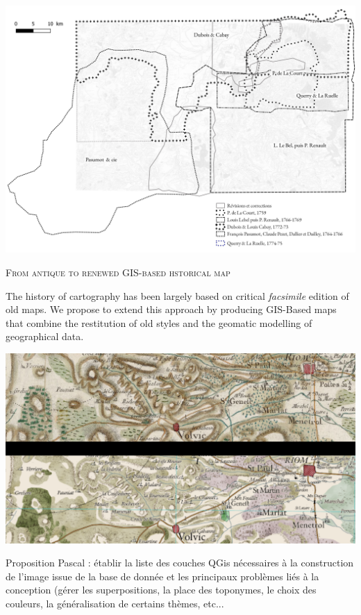 \documentclass[portrait, A0]{sciposter}
\begin{document}
\begin{minipage}[b]{77cm}
\begin{multicols}{3}
\begin{center}
 \label{map:contours}
 \includegraphics[width=21cm]{gfx/Contours.png}
 \end{center}

\normalsize
\textsc{From antique to renewed GIS-based hstorical map}

The history of cartography has been largely based on critical \emph{facsimile} edition of old maps. We propose to extend this approach by producing GIS-Based maps that combine the restitution of old styles and the geomatic modelling of geographical data.

\vfill

\begin{center}
 \includegraphics[width=21cm]{gfx/Fantome52extraits.png}
 \end{center}

\scriptsize Proposition Pascal : établir la liste des couches QGis nécessaires à la construction de l'image issue de la base de donnée et les principaux problèmes liés à la conception (gérer les superpositions, la place des toponymes, le choix des couleurs, la généralisation de certains thèmes, etc...
\end{multicols}
\end{minipage}
\end{document}
